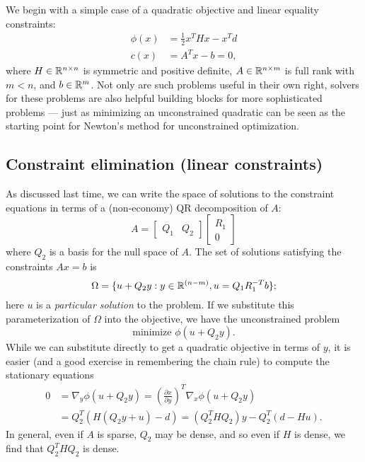 \documentclass[12pt, leqno]{article} %
\begin{document}

We begin with a simple case of a quadratic objective and linear
equality constraints:
\begin{align*}
  \phi(x) &= \frac{1}{2} x^T H x - x^T d \\
  c(x) &= A^T x-b = 0,
\end{align*}
where $H \in \mathbb{R}^{n \times n}$ is symmetric and positive definite,
$A \in \mathbb{R}^{n \times m}$ is full rank with $m < n$, and $b \in \mathbb{R}^m$.
Not only are such problems useful in their own right, solvers for
these problems are also helpful building blocks for more sophisticated
problems --- just as minimizing an unconstrained quadratic can be seen
as the starting point for Newton's method for unconstrained optimization.

\subsection*{Constraint elimination (linear constraints)}

As discussed last time, we can write the space of solutions to the
constraint equations in terms of a (non-economy) QR decomposition
of $A$:
\[
  A =
  \begin{bmatrix} Q_1 & Q_2 \end{bmatrix}
  \begin{bmatrix} R_1 \\ 0 \end{bmatrix}
\]
where $Q_2$ is a basis for the null space of $A$.  The set of
solutions satisfying the constraints $Ax = b$ is
\[
  \Omega = \{ u + Q_2 y : y \in \mathbb{R}^{(n-m)}, u = Q_1 R_1^{-T} b \};
\]
here $u$ is a {\em particular solution} to the problem.  If we
substitute this parameterization of $\Omega$ into the objective,
we have the unconstrained problem
\[
  \mbox{minimize } \phi(u + Q_2 y).
\]
While we can substitute directly to get a quadratic objective in
terms of $y$, it is easier (and a good exercise in remembering
the chain rule) to compute the stationary equations
\begin{align*}
  0
  &= \nabla_y \phi(u + Q_2 y) 
  = \left(\frac{\partial x}{\partial y}\right)^T \nabla_x \phi(u+Q_2 y) \\
  &= Q_2^T (H (Q_2 y + u) - d) 
  = (Q_2^T H Q_2) y - Q_2^T (d-Hu).
\end{align*}
In general, even if $A$ is sparse, $Q_2$ may be dense, and so even if
$H$ is dense, we find that $Q_2^T H Q_2$ is dense.
\end{document}
